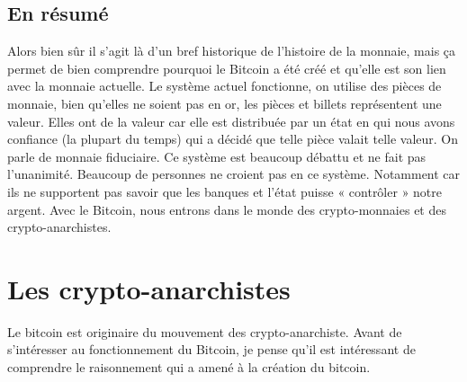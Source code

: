 \documentclass{bredele} %
\begin{document}
    \section*{En résumé}
    Alors bien sûr il s’agit là d’un bref historique de l’histoire de la monnaie, mais ça permet de bien comprendre pourquoi le Bitcoin a été créé et qu’elle est son lien avec la monnaie actuelle.
    \newline
    Le système actuel fonctionne, on utilise des pièces de monnaie, bien qu’elles ne soient pas en or, les pièces et billets représentent une valeur.
    \newline
    Elles ont de la valeur car elle est distribuée par un état en qui nous avons confiance (la plupart du temps) qui a décidé que telle pièce valait telle valeur. On parle de monnaie fiduciaire.
    \newline
    Ce système est beaucoup débattu et ne fait pas l’unanimité. Beaucoup de personnes ne croient pas en ce système. Notamment car ils ne supportent pas savoir que les banques et l’état puisse « contrôler » notre argent. Avec le Bitcoin, nous entrons dans le monde des crypto-monnaies et des crypto-anarchistes.

    \chapter{Les crypto-anarchistes}
    Le bitcoin est originaire du mouvement des crypto-anarchiste. Avant de s’intéresser au fonctionnement du Bitcoin, je pense qu’il est intéressant de comprendre le raisonnement qui a amené à la création du bitcoin.
\end{document}
